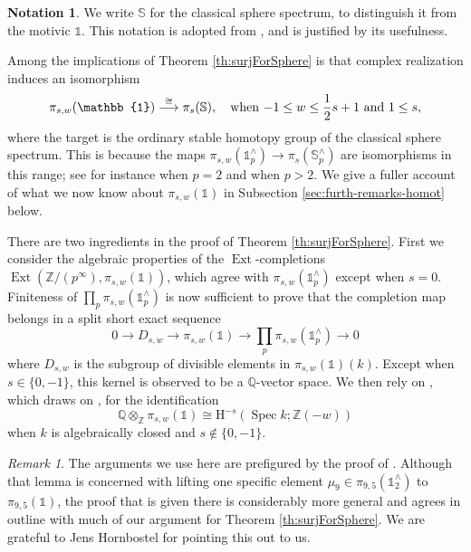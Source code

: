 \documentclass[11pt, oneside, dvipsnames, svgnames, table, final]{amsart}
\newcommand{\mathbx}[1]{\mathbb{#1}}
\theoremstyle{plain}
\theoremstyle{definition}
\newtheorem{notation}[thm]{Notation}
\theoremstyle{remark}
\newtheorem{remark}[thm]{Remark}
\newcommand{\Q}{\mathbx{Q}}
\newcommand{\Z}{\mathbx{Z}}
\newcommand{\Ext}{\operatorname{Ext}}
\newcommand{\tensor}{\otimes}
\newcommand{\spec}{\operatorname{Spec}}
\newcommand{\Spec}{\spec}
\newcommand{\Hoh}{\mathrm{H}}
\newcommand{\isom}{\cong}
\newcommand{\iso}{\isom}
\newcommand{\mto}[1]{\stackrel{#1}{\longrightarrow}}
\newcommand{\isomto}{\mto{\isom}}
\newcommand{\<}[1]{{\langle}#1 {\rangle}}
\newcommand{\one}{\mathbb{1}}
\newcommand{\SpS}{\mathbb{S}}
\begin{document}
\begin{notation}
  We write $\SpS$ for the classical sphere spectrum, to distinguish it from the motivic $\one$. This notation is adopted from \cite{Rondigs2024}, and is justified by its usefulness.
\end{notation}

Among the implications of Theorem \ref{th:surjForSphere} is that complex realization induces an isomorphism
\begin{equation}
  \label{eq:3}
 \pi_{s,w}(\one) \isomto \pi_s(\SpS), \text{\quad when $-1 \le w \le \frac{1}{2}s+1$ and $1 \le s$},
\end{equation}
where the target is the ordinary stable homotopy group of the classical sphere spectrum. This is because the maps  $\pi_{s,w}(\one^{\wedge}_p) \to \pi_s(\SpS^{\wedge}_p)$ are isomorphisms in this range; see for instance \cite{Gheorghe2017} when $p=2$ and \cite{Stahn2018} when $p>2$.
We give a fuller account of what we now know about $\pi_{s,w}(\one)$ in Subsection \ref{sec:furth-remarks-homot} below.


There are two ingredients in the proof of Theorem \ref{th:surjForSphere}. First we consider the algebraic properties of the $\Ext$-completions $\Ext(\Z/(p^\infty), \pi_{s,w}(\one))$, which agree with $\pi_{s,w}(\one^{\wedge}_p)$ except when $s=0$. Finiteness of $\prod_{p} \pi_{s,w}(\one^\wedge_p)$ is now sufficient to prove that the completion map belongs in a split short exact sequence 
\[ 0 \to D_{s,w} \to \pi_{s,w}(\one) \to \prod_p \pi_{s,w}(\one^{\wedge}_p) \to 0\]
where $D_{s,w}$ is the subgroup of divisible elements in $\pi_{s,w}(\one)(k)$. Except when $s\in \{0,-1\}$, this kernel is observed to be a $\Q$-vector space. We then rely on \cite{Ananyevskiy2017}, which draws on \cite{Cisinski2019}, for the identification 
\[ \Q \tensor_\Z \pi_{s,w}(\one) \iso \Hoh^{-s}(\Spec k; \Z(-w)) \] 
when $k$ is algebraically closed and $s \not \in \{0, -1\}$.

\begin{remark}\label{rem:Hornbostel}
  The arguments we use here are prefigured by the proof of \cite[Lemma 2.10]{Hornbostel2018}. Although that lemma is concerned with lifting one specific element $\mu_9 \in \pi_{9,5}(\one^\wedge_2)$ to $\pi_{9,5}(\one)$, the proof that is given there is considerably more general and agrees in outline with much of our argument for Theorem \ref{th:surjForSphere}. We are grateful to Jens Hornbostel for pointing this out to us.
\end{remark}
\end{document}
